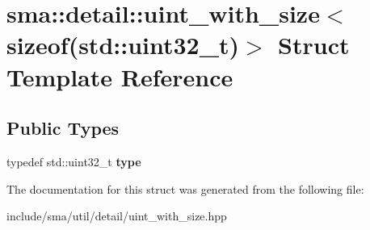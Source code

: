 \hypertarget{structsma_1_1detail_1_1uint__with__size_3_01sizeof_07std_1_1uint32__t_08_4}{\section{sma\-:\-:detail\-:\-:uint\-\_\-with\-\_\-size$<$ sizeof(std\-:\-:uint32\-\_\-t)$>$ Struct Template Reference}
\label{structsma_1_1detail_1_1uint__with__size_3_01sizeof_07std_1_1uint32__t_08_4}
}
\subsection*{Public Types}
\begin{DoxyCompactItemize}
\item 
\hypertarget{structsma_1_1detail_1_1uint__with__size_3_01sizeof_07std_1_1uint32__t_08_4_a8022c6026be829bec1ef69ccfb6868d4}{typedef std\-::uint32\-\_\-t {\bfseries type}}\label{structsma_1_1detail_1_1uint__with__size_3_01sizeof_07std_1_1uint32__t_08_4_a8022c6026be829bec1ef69ccfb6868d4}

\end{DoxyCompactItemize}


The documentation for this struct was generated from the following file\-:\begin{DoxyCompactItemize}
\item 
include/sma/util/detail/uint\-\_\-with\-\_\-size.\-hpp\end{DoxyCompactItemize}
